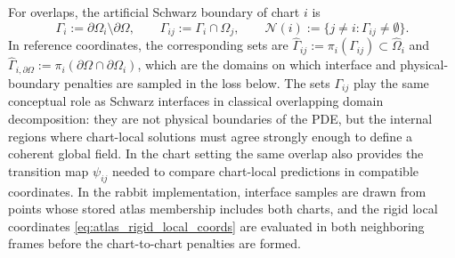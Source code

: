 \documentclass[sort&compress]{svjour3} %
\begin{document}
For overlaps, the artificial Schwarz boundary of chart $i$ is
\begin{equation}
\Gamma_i:=\partial\Omega_i\setminus \partial\Omega,
\qquad
\Gamma_{ij}:=\Gamma_i\cap \Omega_j,
\qquad
\mathcal{N}(i):=\{j\neq i:\Gamma_{ij}\neq\emptyset\}.
\label{eq:schwarz_sets}
\end{equation}
In reference coordinates, the corresponding sets are $\widehat{\Gamma}_{ij}:=\pi_i(\Gamma_{ij})\subset\widehat{\Omega}_i$ and $\widehat{\Gamma}_{i,\partial\Omega}:=\pi_i(\partial\Omega\cap\partial\Omega_i)$, which are the domains on which interface and physical-boundary penalties are sampled in the loss below. The sets $\Gamma_{ij}$ play the same conceptual role as Schwarz interfaces in classical overlapping domain decomposition: they are not physical boundaries of the PDE, but the internal regions where chart-local solutions must agree strongly enough to define a coherent global field. In the chart setting the same overlap also provides the transition map $\psi_{ij}$ needed to compare chart-local predictions in compatible coordinates. In the rabbit implementation, interface samples are drawn from points whose stored atlas membership includes both charts, and the rigid local coordinates \eqref{eq:atlas_rigid_local_coords} are evaluated in both neighboring frames before the chart-to-chart penalties are formed.
\end{document}
